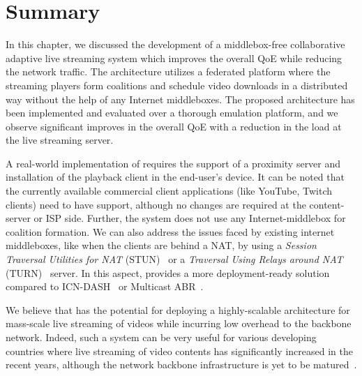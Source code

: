 \section{Summary}
In this chapter, we discussed the development of a middlebox-free collaborative adaptive live streaming system which improves the overall QoE while reducing the network traffic. The architecture utilizes a federated platform where the streaming players form coalitions and schedule video downloads in a distributed way without the help of any Internet middleboxes. The proposed architecture has been implemented and evaluated over a thorough emulation platform, and we observe significant improves in the overall QoE with a reduction in the load at the live streaming server. 

A real-world implementation of {\our} requires the support of a proximity server and installation of the playback client in the end-user's device. It can be noted that the currently available commercial client applications (like YouTube, Twitch clients) need to have {\our} support, although no changes are required at the content-server or ISP side. Further, the system does not use any Internet-middlebox for coalition formation. We can also address the issues faced by existing internet middleboxes, like when the clients are behind a NAT, by using a \textit{Session Traversal Utilities for NAT} (STUN)~\cite{rfc5389_stun} or a \textit{Traversal Using Relays around NAT} (TURN)~\cite{rfc5766_turn} server. In this aspect, {\our} provides a more deployment-ready solution compared to ICN-DASH~\cite{ICN-DASH} or Multicast ABR~\cite{multicastAbrCablelabs}.

We believe that {\our} has the potential for deploying a highly-scalable architecture for mass-scale live streaming of videos while incurring low overhead to the backbone network. Indeed, such a system can be very useful for various developing countries where live streaming of video contents has significantly increased in the recent years, although the network backbone infrastructure is yet to be matured~\cite{kiedanski2019youtube}.
